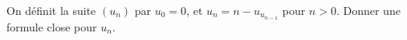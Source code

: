 On définit la suite $(u_n)$ par $u_0 = 0$, et $u_n = n - u_{u_{n-1}}$ pour $n > 0$. Donner une formule close pour $u_n$.
